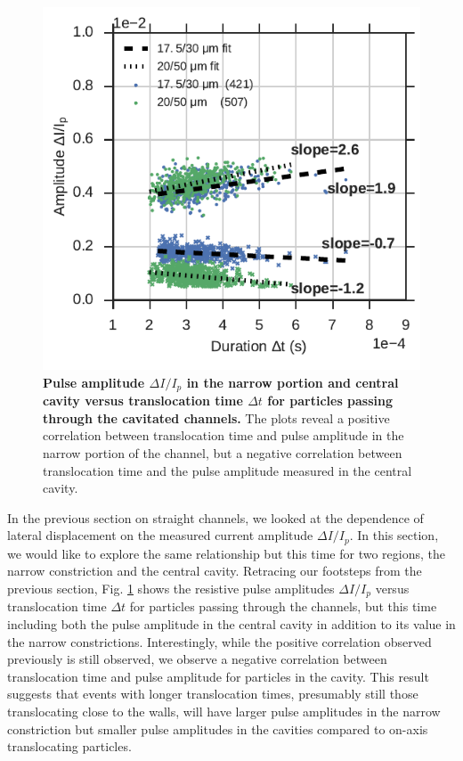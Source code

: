 			\begin{figure}
				\includegraphics[width=\textwidth]{dIdtcavity.pdf}
				\caption{\textbf{Pulse amplitude $\Delta I/I_{p}$ in the narrow portion and central cavity versus translocation time $\Delta t$ for particles passing through the cavitated channels.} The plots reveal a positive correlation between translocation time and pulse amplitude in the narrow portion of the channel, but a negative correlation between translocation time and the pulse amplitude measured in the central cavity.}
				\label{fig:dIdtcavity}
			\end{figure}

		    
		    
		    
			In the previous section on straight channels, we looked at the dependence of lateral displacement on the measured current amplitude $\Delta I/I_{p}$. In this section, we would like to explore the same relationship but this time for two regions, the narrow constriction and the central cavity. Retracing our footsteps from the previous section, Fig. \ref{fig:dIdtcavity} shows the resistive pulse amplitudes $\Delta I/I_{p}$ versus translocation time $\Delta t$ for particles passing through the channels, but this time including both the pulse amplitude in the central cavity in addition to its value in the narrow constrictions. Interestingly, while the positive correlation observed previously is still observed, we observe a negative correlation between translocation time and pulse amplitude for particles in the cavity. This result suggests that events with longer translocation times, presumably still those translocating close to the walls, will have larger pulse amplitudes in the narrow constriction but smaller pulse amplitudes in the cavities compared to on-axis translocating particles. 

			
			
		
		
		



